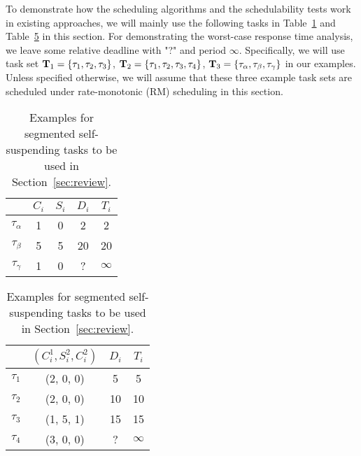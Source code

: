 To demonstrate how the scheduling algorithms and the schedulability tests work in existing approaches, we will mainly use the following tasks in Table~\ref{table:dynamic-example} and Table~\ref{table:static-example} in this section. For demonstrating the worst-case response time analysis, we leave some relative deadline with "?" and period $\infty$. Specifically, we will use task set ${\bf T}_1 = \left\{{\tau_1, \tau_2, \tau_3}\right\}$, ${\bf T}_2 = \left\{{\tau_1, \tau_2, \tau_3, \tau_4}\right\}$, ${\bf T}_3 = \left\{{\tau_\alpha, \tau_\beta, \tau_\gamma}\right\}$ in our examples. Unless specified otherwise, we will assume that these three example task sets are scheduled under rate-monotonic (RM) scheduling in this section. 

\ifpaper
\begin{table}[t]
\else
\begin{table} 
\fi
\centering
    \begin{tabular}{|c|c|c|c|c|}
 \hline
        & $C_i$ &  $S_i$&  $D_i$ & $T_i$\\ 
        \hline
        $\tau_\alpha$ & 1 & 0 &  2 & 2\\ 
        $\tau_\beta$ &  5&  5& 20 & 20 \\ 
        $\tau_\gamma$ & 1 & 0  & ? & $\infty$ \\ 
        \hline
    \end{tabular} 
    \caption{Examples for dynamic self-suspending tasks to be used in Section~\ref{sec:review}.}
    \label{table:dynamic-example}
\end{table}

\ifpaper
\begin{table}[t]
\else
\begin{table} 
\fi
\centering
    \begin{tabular}{|c|c|c|c|}
 \hline
        & $(C_i^1, S_i^2, C_i^2)$ &  $D_i$ & $T_i$\\ 
        \hline
        $\tau_1$ & (2, 0, 0) &  5 & 5\\ 
        $\tau_2$ &  (2, 0, 0) & 10 & 10 \\ 
        $\tau_3$ & (1, 5, 1) & 15  & 15\\
        $\tau_4$ & (3, 0, 0) & ? & $\infty$\\
        \hline
    \end{tabular} 
    \caption{Examples for segmented self-suspending tasks to be used in Section~\ref{sec:review}.}
    \label{table:static-example}
\end{table}





\end{table}
\end{table}
